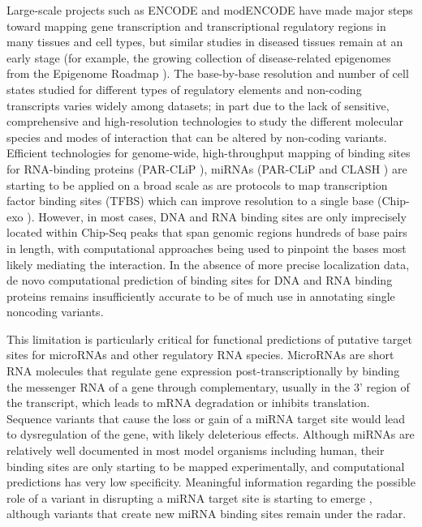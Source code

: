 Large-scale projects such as ENCODE \cite{encode2012integrated} and modENCODE \cite{celniker2009unlocking} have made major steps toward mapping gene transcription and transcriptional regulatory regions in many tissues and cell types, but similar studies in diseased tissues remain at an early stage (for example, the growing collection of disease-related epigenomes from the Epigenome Roadmap \cite{bernstein2010nih}). The base-by-base resolution and number of cell states studied for different types of regulatory elements and non-coding transcripts varies widely among datasets; in part due to the lack of sensitive, comprehensive and high-resolution technologies to study the different molecular species and modes of interaction that can be altered by non-coding variants. Efficient technologies for genome-wide, high-throughput mapping of binding sites for RNA-binding proteins (PAR-CLiP \cite{ascano2012identification}), miRNAs (PAR-CLiP \cite{hafner2012genome} and CLASH \cite{helwak2013mapping}) are starting to be applied on a broad scale as are protocols to map transcription factor binding sites (TFBS) which can improve resolution to a single base (Chip-exo \cite{rhee2012chip}). However, in most cases, DNA and RNA binding sites are only imprecisely located within Chip-Seq peaks that span genomic regions hundreds of base pairs in length, with computational approaches being used to pinpoint the bases most likely mediating the interaction. In the absence of more precise localization data, de novo computational prediction of binding sites for DNA and RNA binding proteins remains insufficiently accurate to be of much use in annotating single noncoding variants.

This limitation is particularly critical for functional predictions of putative target sites for microRNAs and other regulatory RNA species. MicroRNAs are short RNA molecules that regulate gene expression post-transcriptionally by binding the messenger RNA of a gene through complementary, usually in the 3' region of the transcript, which leads to mRNA degradation or inhibits translation. Sequence variants that cause the loss or gain of a miRNA target site would lead to dysregulation of the gene, with likely deleterious effects. Although miRNAs are relatively well documented in most model organisms including human, their binding sites are only starting to be mapped experimentally, and computational predictions has very low specificity. Meaningful information regarding the possible role of a variant in disrupting a miRNA target site is starting to emerge \cite{liu2012mirsnp}, although variants that create new miRNA binding sites remain under the radar.

